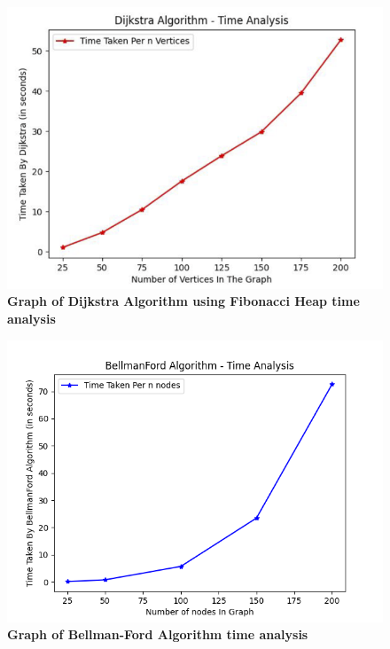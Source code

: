 \documentclass[a4paper, 12pt]{report}
\begin{document}
    \begin{figure}
          \centering
          \includegraphics[width=12cm]{images/fibheapdj.png}
          \caption{\textbf{Graph of Dijkstra Algorithm using Fibonacci Heap time analysis}}   
          \label{fig:picture4}
    \end{figure}      
    \begin{figure}      
          \centering
          \includegraphics[width=12cm]{images/bellman-ford.png}
          \caption{\textbf{Graph of Bellman-Ford Algorithm time analysis}}   
          \label{fig:picture5}
    \end{figure}
\end{document}
